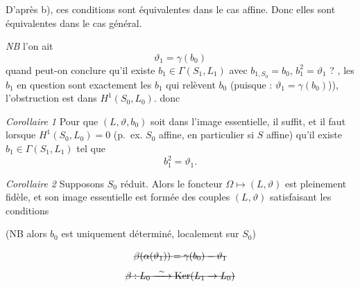 \documentclass[11pt,a4paper]{article}
\begin{document}

D'après b), ces conditions sont équivalentes dans le cas affine. Donc elles sont équivalentes dans le cas général.

\emph{NB}     l'on ait \struck{\ill{}} 
\[
  \vartheta_1 = \gamma(b_0)
\]
quand peut-on conclure qu'il existe $b_1 \in \Gamma(S_1, L_1)$ avec $b_{1, S_0} = b_0$, $b_1^2 = \vartheta_1$ ?  , les $b_1$ en question sont exactement les $b_1$ qui relèvent $b_0$ (puisque : $\vartheta_1 = \gamma(b_0)$)),  l'obstruction est dans $H^1(S_0, L_0)$.  donc

\emph{Corollaire 1} Pour que $(L, \vartheta, b_0)$ soit dans l'image essentielle, il \struck{\ill{}} suffit, et il faut lorsque $H^1(S_0, L_0) = 0$ \struck{\ill{}} (p.~ex. $S_0$ affine, en particulier si $S$ affine) qu'il existe $b_1 \in \Gamma(S_1, L_1)$ tel que
\[
  b_1^2 = \vartheta_1 .
\]

\emph{Corollaire 2} Supposons $S_0$ réduit. Alors le foncteur $\Omega \longmapsto (L, \vartheta)$ est pleinement fidèle, et son image essentielle est formée des couples $(L, \vartheta)$ satisfaisant les  conditions


 (NB alors $b_0$ est uniquement déterminé,  localement sur $S_0$)

  \struck{\ill{}}  

 
\[
  \text{\struck{$\beta(\alpha(\vartheta_1)) = \gamma(b_0) - \vartheta_1$}}
\]
\[
  \text{\struck{$\beta : L_0 \xrightarrow{\ \sim\ } \operatorname{Ker}(L_1 \to L_0)$}}
\]
\end{document}
